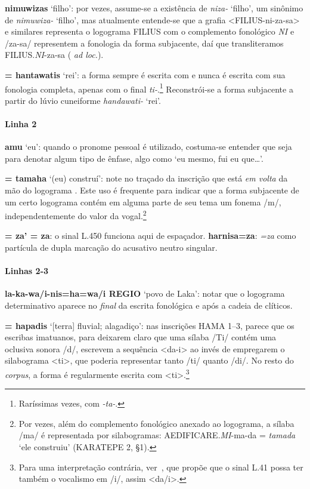 \noindent\textbf{nimuwizas} `filho': por vezes, assume-se a existência de \emph{niza-}
`filho', um sinônimo de \emph{nimuwiza-} `filho', mas atualmente entende-se que
a grafia <FILIUS-ni-za-sa> e similares representa o logograma FILIUS com o
complemento fonológico \emph{NI} e /za-sa/ representem a fonologia da forma
subjacente, daí que transliteramos FILIUS.\emph{NI}-za-sa
( \emph{ad loc.}).

\noindent{} \textbf{= hantawatis} `rei': a forma sempre é escrita com  e
nunca é escrita com sua fonologia completa,
apenas com o final \emph{ti-}.\footnote{Raríssimas vezes, com \emph{-ta-}.}
Reconstrói-se a forma subjacente a partir do lúvio cuneiforme
\emph{handawati-} `rei'.

\paragraph{Linha 2}
\textbf{amu} `eu': quando o pronome pessoal é utilizado, costuma-se entender que
seja para denotar algum tipo de ênfase, algo como `eu mesmo, fui eu que\ldots{}'.

\noindent{} \textbf{= tamaha} `(eu) construí': note no
traçado da inscrição que  está \emph{em volta} da mão do
logograma . Este uso é frequente para indicar que a
forma subjacente de um certo logograma contém em alguma parte de seu tema um
fonema /m/, independentemente do valor da vogal.\footnote{Por vezes, além
	do complemento fonológico anexado ao logograma, a sílaba /ma/ é representada
	por silabogramas: AEDIFICARE.\emph{MI}-ma-da = \emph{tamada} `ele construiu'
	(KARATEPE 2, §1).}

\noindent{} \textbf{= za' = za}: o sinal L.450  funciona
aqui de espaçador.
\textbf{harnisa=za}: \emph{=za} como partícula de dupla marcação do acusativo
neutro singular.

\paragraph{Linhas 2-3}
\textbf{la-ka-wa/i-nis=ha=wa/i REGIO} `povo de Laka': notar que o logograma
determinativo aparece no \emph{final} da escrita fonológica e após a cadeia de
clíticos.

\noindent{} \textbf{= hapadis} `[terra] fluvial;
alagadiço': nas inscrições HAMA 1--3, parece que os escribas imatuanos,
para deixarem claro que uma sílaba /Ti/ contém uma oclusiva sonora /d/,
escrevem a sequência  <da-i> ao invés de empregarem o
silabograma  <ti>, que poderia representar tanto /ti/ quanto
/di/. No resto do \emph{corpus}, a forma é regularmente escrita com
 <ti>.\footnote{
	Para uma interpretação contrária, ver~\citet{Simon2019}, que propõe que o
	sinal L.41 possa ter também o vocalismo em /i/, assim <da/i>.
}

